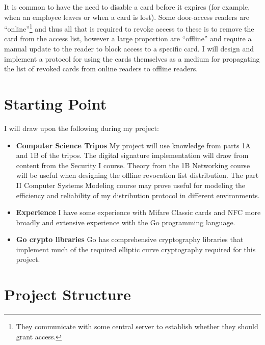 \documentclass[a4paper, 12pt]{article}
\begin{document}
  It is common to have the need to disable a card before it expires (for
  example, when an employee leaves or when a card is lost). Some door-access
  readers are ``online''\footnote{They communicate with some central server to
  establish whether they should grant access.} and thus all that is required to
  revoke access to these is to remove the card from the access list, however a
  large proportion are ``offline''\footnotemark{} and require a manual update to
  the reader to block access to a specific card. I will design and implement a
  protocol for using the cards themselves as a medium for propagating the list
  of revoked cards from online readers to offline readers.




  \section*{Starting Point}

  I will draw upon the following during my project:

  \begin{itemize}
    \item \textbf{Computer Science Tripos} \newline
      My project will use knowledge from parts 1A and 1B of the tripos. The
      digital signature implementation will draw from content from the Security
      I course. Theory from the 1B Networking course will be useful when
      designing the offline revocation list distribution. The part II Computer
      Systems Modeling course may prove useful for modeling the efficiency and
      reliability of my distribution protocol in different environments.

    \item \textbf{Experience} \newline
      I have some experience with Mifare Classic cards and NFC more broadly and
      extensive experience with the Go programming language.

    \item \textbf{Go crypto libraries} \newline
      Go has comprehensive cryptography libraries that implement much of the
      required elliptic curve cryptography required for this project.
  \end{itemize}

  \section*{Project Structure}
\end{document}
